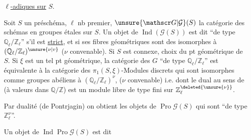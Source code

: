 \uline{ $\ell$-adiques sur} $S$.

Soit $S$ un préschéma, $\ell$ nb premier,   $\unsure{\mathscr G|\mathcal G}(S)$ la catégorie des schémas en groupes  étales sur $S$. Un objet de $\operatorname{Ind}(\mathscr G(S))$ est dit ``de type $\mathbb Q_\ell/\mathbb Z_\ell$'' s'il est \uline{strict}, et si ses fibres géométriques sont des  isomorphes à $(\mathbb Q_\ell/\mathbb Z_\ell)^{\unsure{\nu|v}}$ ($\nu$ convenable). Si $S$ est connexe,   choix du pt géométrique de $S$. Si $\xi$ est un tel pt géométrique, la  catégorie des  $G$ ``de type $\mathbb Q_\ell/\mathbb Z_\ell$'' est  équivalente à la catégorie des \deleted{\unsure{$\xi$}} $\pi_1(S,\xi)$-Modules discrets qui sont isomorphes comme groupes abéliens à $(\mathbb Q_\ell/\mathbb Z_\ell)^\nu$,  ($\nu$ convenable) i.e. dont le dual au sens de  (à valeurs dans $\mathbb Q/\mathbb Z$) est  un module libre de type fini sur $\mathbb Z_\ell^{\deleted{\unsure{\nu}}}$.

Par dualité (de Pontrjagin) on obtient les objets de $\operatorname{Pro}\mathscr G(S)$ qui sont ``de type $\mathbb Z_\ell^\nu$''.

Un objet de $\operatorname{Ind}\operatorname{Pro}\mathscr G(S)$ est dit
